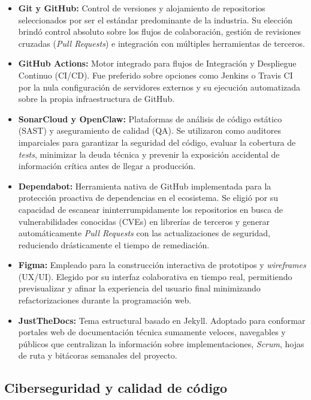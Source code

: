 \begin{itemize}
    \item \textbf{Git y GitHub:} Control de versiones y alojamiento de repositorios seleccionados por ser el estándar predominante de la industria. Su elección brindó control absoluto sobre los flujos de colaboración, gestión de revisiones cruzadas (\textit{Pull Requests}) e integración con múltiples herramientas de terceros.
    \item \textbf{GitHub Actions:} Motor integrado para flujos de Integración y Despliegue Continuo (CI/CD). Fue preferido sobre opciones como Jenkins o Travis CI por la nula configuración de servidores externos y su ejecución automatizada sobre la propia infraestructura de GitHub.
    \item \textbf{SonarCloud y OpenClaw:} Plataformas de análisis de código estático (SAST) y aseguramiento de calidad (QA). Se utilizaron como auditores imparciales para garantizar la seguridad del código, evaluar la cobertura de \textit{tests}, minimizar la deuda técnica y prevenir la exposición accidental de información crítica antes de llegar a producción.
    \item \textbf{Dependabot:} Herramienta nativa de GitHub implementada para la protección proactiva de dependencias en el ecosistema. Se eligió por su capacidad de escanear ininterrumpidamente los repositorios en busca de vulnerabilidades conocidas (CVEs) en librerías de terceros y generar automáticamente \textit{Pull Requests} con las actualizaciones de seguridad, reduciendo drásticamente el tiempo de remediación.
    \item \textbf{Figma:} Empleado para la construcción interactiva de prototipos y \textit{wireframes} (UX/UI). Elegido por su interfaz colaborativa en tiempo real, permitiendo previsualizar y afinar la experiencia del usuario final minimizando refactorizaciones durante la programación web.
    \item \textbf{JustTheDocs:} Tema estructural basado en Jekyll. Adoptado para conformar portales web de documentación técnica sumamente veloces, navegables y públicos que centralizan la información sobre implementaciones, \textit{Scrum}, hojas de ruta y bitácoras semanales del proyecto.
\end{itemize}

\subsection{Ciberseguridad y calidad de código}

